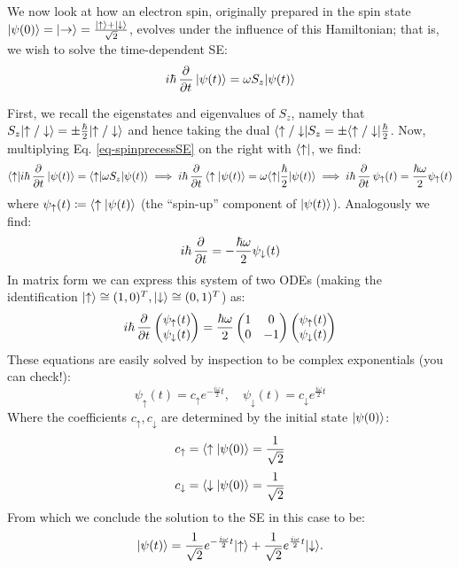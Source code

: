 We now look at how an electron spin, originally prepared in the spin state $\lvert \psi(0) \rangle = \lvert \rightarrow \rangle = \frac{\lvert \uparrow \rangle + \lvert \downarrow \rangle}{\sqrt{2}}$, evolves under the influence of this Hamiltonian; that is, we wish to solve the time-dependent SE:
\begin{equation}\label{eq-spinprecessSE}
    i\hbar\dpd{}{t}\ket{\psi(t)} = \omega S_z\ket{\psi(t)}
\end{equation}

First, we recall the eigenstates and eigenvalues of $S_z$, namely that $S_z\lvert \uparrow/\downarrow \rangle = \pm \frac{\hbar}{2}\lvert \uparrow/\downarrow \rangle$ and hence taking the dual $\langle \uparrow/\downarrow \rvert S_z = \pm \langle \uparrow/\downarrow \rvert\frac{\hbar}{2}$. Now, multiplying Eq. \eqref{eq-spinprecessSE} on the right with $\langle \uparrow \rvert$, we find:
\begin{equation}
    \bra{\uparrow}i\hbar\dpd{}{t}\ket{\psi(t)} = \bra{\uparrow}\omega S_z \ket{\psi(t)} \implies i\hbar\dpd{}{t}\braket{\uparrow}{\psi(t)} = \omega\bra{\uparrow}\frac{\hbar}{2}\ket{\psi(t)} \implies i\hbar\dpd{}{t}\psi_\uparrow(t) = \frac{\hbar\omega}{2}\psi_\uparrow(t)
\end{equation}
where $\psi_\uparrow(t) \coloneqq \langle \uparrow \lvert \psi(t) \rangle$ (the ``spin-up'' component of $\lvert \psi(t) \rangle$). Analogously we find:
\begin{equation}
    i\hbar\dpd{}{t} = -\frac{\hbar\omega}{2}\psi_\downarrow(t)
\end{equation}
In matrix form we can express this system of two ODEs (making the identification $\lvert \uparrow \rangle \cong (1, 0)^T, \lvert \downarrow \rangle \cong (0, 1)^T$) as:
\begin{equation}
    i\hbar\dpd{}{t}\m{\psi_\uparrow(t) \\ \psi_\downarrow(t)} = \frac{\hbar\omega}{2}\m{1 & 0 \\ 0 & -1}\m{\psi_\uparrow(t) \\ \psi_\downarrow(t)}
\end{equation}
These equations are easily solved by inspection to be complex exponentials (you can check!):
\begin{equation}
    \psi_\uparrow(t) = c_\uparrow e^{-\frac{i\omega}{2}t}, \quad \psi_\downarrow(t) = c_\downarrow e^{\frac{i\omega}{2} t}
\end{equation}
Where the coefficients $c_\uparrow, c_\downarrow$ are determined by the initial state $\lvert \psi(0) \rangle$:
\begin{equation}
    c_\uparrow = \langle \uparrow \lvert \psi(0) \rangle = \frac{1}{\sqrt{2}}
\end{equation}
\begin{equation}
    c_\downarrow = \langle \downarrow \lvert \psi(0) \rangle = \frac{1}{\sqrt{2}}
\end{equation}
From which we conclude the solution to the SE in this case to be:
\begin{equation}\label{eq-spinprecesssoln}
    \lvert \psi(t) \rangle = \frac{1}{\sqrt{2}}e^{-\frac{i\omega}{2}t}\lvert \uparrow \rangle + \frac{1}{\sqrt{2}}e^{\frac{i\omega}{2} t}\lvert \downarrow \rangle.
\end{equation}

